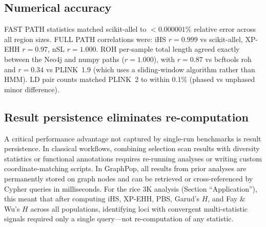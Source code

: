 \subsection*{Numerical accuracy}

FAST PATH statistics matched scikit-allel to $< 0.000001\%$ relative error across all region sizes. FULL PATH correlations were: iHS $r = 0.999$ vs scikit-allel, XP-EHH $r = 0.97$, nSL $r = 1.000$. ROH per-sample total length agreed exactly between the Neo4j and numpy paths ($r = 1.000$), with $r = 0.87$ vs bcftools roh and $r = 0.34$ vs PLINK~1.9 (which uses a sliding-window algorithm rather than HMM). LD pair counts matched PLINK~2 to within 0.1\% (phased vs unphased minor difference).

\subsection*{Result persistence eliminates re-computation}

A critical performance advantage not captured by single-run benchmarks is result persistence. In classical workflows, combining selection scan results with diversity statistics or functional annotations requires re-running analyses or writing custom coordinate-matching scripts. In GraphPop, all results from prior analyses are permanently stored on graph nodes and can be retrieved or cross-referenced by Cypher queries in milliseconds. For the rice 3K analysis (Section ``Application''), this meant that after computing iHS, XP-EHH, PBS, Garud's $H$, and Fay \& Wu's $H$ across all populations, identifying loci with convergent multi-statistic signals required only a single query---not re-computation of any statistic.
